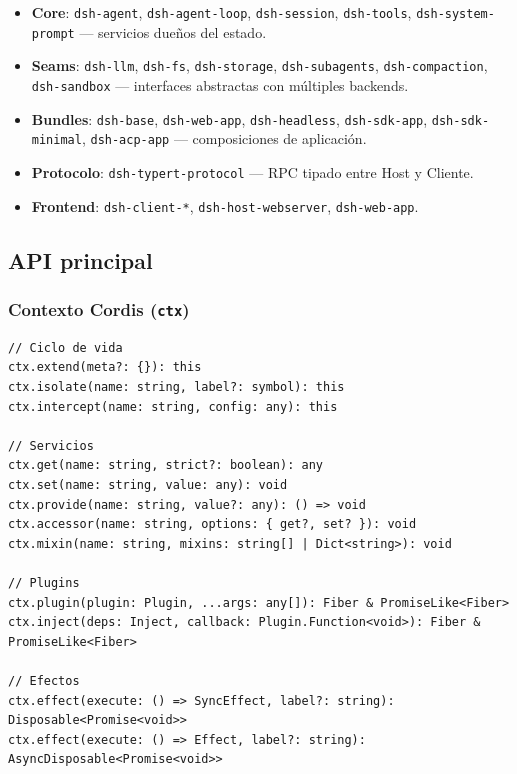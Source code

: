 \documentclass[11pt,a4paper]{article}
\begin{document}
\begin{itemize}[leftmargin=*,topsep=2pt,itemsep=1pt]
  \item \textbf{Core}: \texttt{dsh-agent}, \texttt{dsh-agent-loop}, \texttt{dsh-session}, \texttt{dsh-tools}, \texttt{dsh-system-prompt} — servicios dueños del estado.
  \item \textbf{Seams}: \texttt{dsh-llm}, \texttt{dsh-fs}, \texttt{dsh-storage}, \texttt{dsh-subagents}, \texttt{dsh-compaction}, \texttt{dsh-sandbox} — interfaces abstractas con múltiples backends.
  \item \textbf{Bundles}: \texttt{dsh-base}, \texttt{dsh-web-app}, \texttt{dsh-headless}, \texttt{dsh-sdk-app}, \texttt{dsh-sdk-minimal}, \texttt{dsh-acp-app} — composiciones de aplicación.
  \item \textbf{Protocolo}: \texttt{dsh-typert-protocol} — RPC tipado entre Host y Cliente.
  \item \textbf{Frontend}: \texttt{dsh-client-*}, \texttt{dsh-host-webserver}, \texttt{dsh-web-app}.
\end{itemize}


\subsection*{API principal}


\subsubsection*{Contexto Cordis (\texttt{ctx})}


\begin{lstlisting}
// Ciclo de vida
ctx.extend(meta?: {}): this
ctx.isolate(name: string, label?: symbol): this
ctx.intercept(name: string, config: any): this

// Servicios
ctx.get(name: string, strict?: boolean): any
ctx.set(name: string, value: any): void
ctx.provide(name: string, value?: any): () => void
ctx.accessor(name: string, options: { get?, set? }): void
ctx.mixin(name: string, mixins: string[] | Dict<string>): void

// Plugins
ctx.plugin(plugin: Plugin, ...args: any[]): Fiber & PromiseLike<Fiber>
ctx.inject(deps: Inject, callback: Plugin.Function<void>): Fiber & PromiseLike<Fiber>

// Efectos
ctx.effect(execute: () => SyncEffect, label?: string): Disposable<Promise<void>>
ctx.effect(execute: () => Effect, label?: string): AsyncDisposable<Promise<void>>
\end{lstlisting}
\end{document}
